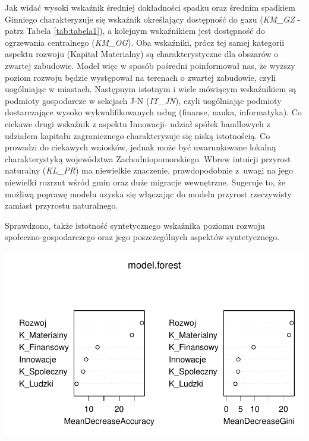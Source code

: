 \documentclass{amuthesis}
\begin{document}
Jak widać wysoki wskaźnik średniej dokładności spadku oraz średnim spadkiem Ginniego charakteryzuje się wskaźnik określający dostępność do gazu (\emph{KM\_GZ} - patrz Tabela \ref{tab:tabela1}), a kolejnym wskaźnikiem jest dostępność do ogrzewania centralnego (\emph{KM\_OG}).
Oba wskaźniki, prócz tej samej kategorii aspektu rozwoju (Kapitał Materialny) są charakterystyczne dla obszarów o zwartej zabudowie.
Model więc w sposób pośredni poinformował nas, że wyższy poziom rozwoju będzie występował na terenach o zwartej zabudowie, czyli uogólniając w miastach.
Następnym istotnym i wiele mówiącym wskaźnikiem są podmioty gospodarcze w sekcjach J-N (\emph{IT\_JN}), czyli uogólniając podmioty dostarczające wysoko wykwalifikowanych usług (finanse, nauka, informatyka).
Co ciekawe drugi wskaźnik z aspektu Innowacji- udział spółek handlowych z udziałem kapitału zagranicznego charakteryzuje się niską istotnością.
Co prowadzi do ciekawych wniosków, jednak może być uwarunkowane lokalną charakterystyką województwa Zachodniopomorskiego.
Wbrew intuicji przyrost naturalny (\emph{KL\_PR}) ma niewielkie znaczenie, prawdopodobnie z~uwagi na jego niewielki rozrzut wśród gmin oraz duże migracje wewnętrzne.
Sugeruje to, że możliwą poprawę modelu uzyska się włączając do modelu przyrost rzeczywisty zamiast przyrostu naturalnego.

Sprawdzono, także istotność syntetycznego wskaźnika poziomu rozwoju społeczno-gospodarczego oraz jego poszczególnych aspektów syntetycznego.

\begin{Shaded}
\begin{Highlighting}[]
\SpecialCharTok{::} \NormalTok{)}
\end{Highlighting}
\end{Shaded}

\begin{center}\includegraphics[width=1\linewidth]{figures/unnamed-chunk-22-1} \end{center}
\end{document}
